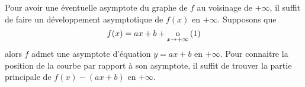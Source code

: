 \documentclass{magnoliaold}
\begin{document}
\begin{remarqueUnique}
\remarque Pour avoir une éventuelle asymptote du graphe de $f$ au voisinage de $+\infty$, il suffit de faire un développement asymptotique de $f(x)$ en $+\infty$. Supposons que
\[f(x)=ax+b+\underset{x \rightarrow +\infty}{\text{o}}\left(1\right)\]
alors $f$ admet une asymptote d'équation $y=ax+b$ en $+\infty$. Pour connaitre la position de la courbe par rapport à son asymptote, il suffit de trouver la partie principale de $f(x)-(ax+b)$ en $+\infty$.


\end{remarqueUnique}
\end{document}
